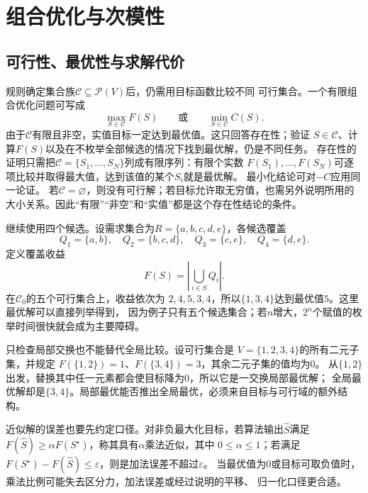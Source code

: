 \section{组合优化与次模性}
\label{sec:comb-optimization-submodularity}

\subsection{可行性、最优性与求解代价}

规则确定集合族$\mathcal{C}\subseteq\mathcal{P}(V)$后，仍需用目标函数比较不同
可行集合。一个有限组合优化问题可写成
\begin{equation}
  \max_{S\in\mathcal{C}}F(S)
  \qquad\text{或}\qquad
  \min_{S\in\mathcal{C}}C(S).
  \label{eq:comb-discrete-optimization}
\end{equation}
由于$\mathcal{C}$有限且非空，实值目标一定达到最优值。这只回答存在性；验证
$S\in\mathcal{C}$、计算$F(S)$以及在不枚举全部候选的情况下找到最优解，仍是不同任务。
存在性的证明只需把$\mathcal{C}=\{S_1,\ldots,S_N\}$列成有限序列：有限个实数
$F(S_1),\ldots,F(S_N)$可逐项比较并取得最大值，达到该值的某个$S_i$就是最优解。
最小化结论可对$-C$应用同一论证。
若$\mathcal{C}=\varnothing$，则没有可行解；若目标允许取无穷值，也需另外说明所用的
大小关系。因此“有限”“非空”和“实值”都是这个存在性结论的条件。

继续使用四个候选。设需求集合为$R=\{a,b,c,d,e\}$，各候选覆盖
\[
  Q_1=\{a,b\},\quad
  Q_2=\{b,c,d\},\quad
  Q_3=\{c,e\},\quad
  Q_4=\{d,e\}.
\]
定义覆盖收益
\begin{equation}
  F(S)=\left|\bigcup_{i\in S}Q_i\right|.
  \label{eq:comb-running-coverage}
\end{equation}
在$\mathcal{C}_0$的五个可行集合上，收益依次为
$2,4,5,3,4$，所以$\{1,3,4\}$达到最优值$5$。这里最优解可以直接列举得到，
因为例子只有五个候选集合；若$n$增大，$2^n$个赋值的枚举时间很快就会成为主要障碍。

只检查局部交换也不能替代全局比较。设可行集合是
$V=\{1,2,3,4\}$的所有二元子集，并规定
$F(\{1,2\})=1$、$F(\{3,4\})=3$，其余二元子集的值均为$0$。
从$\{1,2\}$出发，替换其中任一元素都会使目标降为$0$，所以它是一交换局部最优解；
全局最优解却是$\{3,4\}$。局部最优能否推出全局最优，必须来自目标与可行域的额外结构。

近似解的误差也要先约定口径。对非负最大化目标，若算法输出$\widehat S$满足
$F(\widehat S)\geq\alpha F(S^\star)$，称其具有$\alpha$乘法近似，其中
$0\leq\alpha\leq1$；若满足
$F(S^\star)-F(\widehat S)\leq\varepsilon$，则是加法误差不超过$\varepsilon$。
当最优值为$0$或目标可取负值时，乘法比例可能失去区分力，加法误差或经过说明的平移、
归一化口径更合适。

